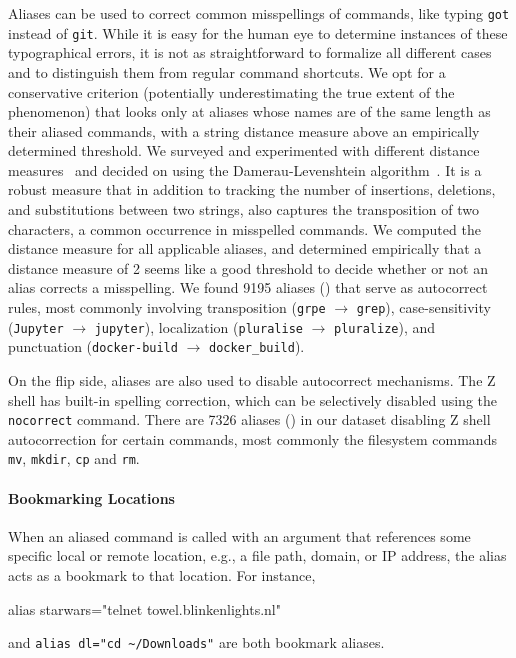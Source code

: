 Aliases can be used to correct common misspellings of commands, like typing \verb|got| instead of \verb|git|.
While it is easy for the human eye to determine instances of these typographical errors, it is not as straightforward to formalize all different cases and to distinguish them from regular command shortcuts.
We opt for a conservative criterion (potentially underestimating the true extent of the phenomenon) that looks only at aliases whose names are of the same length as their aliased commands, with a string distance measure above an empirically determined threshold.
We surveyed and experimented with different distance measures~\cite{navarro:01} and decided on using the Damerau-Levenshtein algorithm~\cite{damerau:64}.
It is a robust measure that in addition to tracking the number of insertions, deletions, and substitutions between two strings, also captures the transposition of two characters, a common occurrence in misspelled commands.
We computed the distance measure for all applicable aliases, and determined empirically that a distance measure of 2 seems like a good threshold to decide whether or not an alias corrects a misspelling.
We found \num{9195} aliases () that serve as autocorrect rules, most commonly involving transposition (\verb|grpe| $\rightarrow$ \verb|grep|), case-sensitivity (\verb|Jupyter| $\rightarrow$ \verb|jupyter|), localization (\verb|pluralise| $\rightarrow$ \verb|pluralize|), and punctuation (\verb|docker-build| $\rightarrow$ \verb|docker_build|).

On the flip side, aliases are also used to disable autocorrect mechanisms.
The Z shell has built-in spelling correction, which can be selectively disabled using the \verb|nocorrect| command.
There are \num{7326} aliases () in our dataset disabling Z shell autocorrection for certain commands, most commonly the filesystem commands \verb|mv|, \verb|mkdir|, \verb|cp| and \verb|rm|.

\paragraph{\bf Bookmarking Locations}

When an aliased command is called with an argument that references some specific local or remote location, e.g., a file path, domain, or IP address, the alias acts as a bookmark to that location.
For instance,
\begin{CVerbatim}
alias starwars="telnet towel.blinkenlights.nl"    
\end{CVerbatim}
and \verb|alias dl="cd ~/Downloads"|
are both bookmark aliases.

